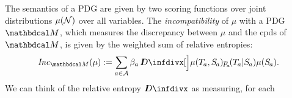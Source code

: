 \documentclass[twoside]{article}
\begin{document}


The semantics of a PDG are given by two scoring functions over joint distributions $\mu(\mathcal N)$ over all variables.
The \emph{incompatibility} of $\mu$ with a PDG $\dg M$, which
measures the discrepancy between $\mu$ and the cpds of $\dg M$,
is given by the weighted sum of relative entropies:
\begin{align*}
    \Inc_{\dg M}(\mu) :=
        \sum_{a \in \Ar} \beta_a\, \kldiv[\Big]{\mu(\Tgt a,\Src a)}{p\ssub a(\Tgt a | \Src a) \mu(\Src a)}.
\end{align*}
We can think of the relative entropy $\kldiv$ as measuring, for each
\end{document}
